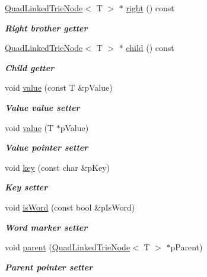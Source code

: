 \begin{DoxyCompactItemize}
\hyperlink{classQuadLinkedTrieNode}{Quad\-Linked\-Trie\-Node}$<$ T $>$ $\ast$ \hyperlink{classQuadLinkedTrieNode_a09d2cf3b6175313271c0f607a870f2c7}{right} () const 
\begin{DoxyCompactList}\small\item\em {\bfseries Right brother getter} \end{DoxyCompactList}\item 
\hyperlink{classQuadLinkedTrieNode}{Quad\-Linked\-Trie\-Node}$<$ T $>$ $\ast$ \hyperlink{classQuadLinkedTrieNode_a386e85a2b259728ec9fbe26907823dcf}{child} () const 
\begin{DoxyCompactList}\small\item\em {\bfseries Child getter} \end{DoxyCompactList}\item 
void \hyperlink{classQuadLinkedTrieNode_af5c5a72f9e54f9cac7c59dea467e4586}{value} (const T \&p\-Value)
\begin{DoxyCompactList}\small\item\em {\bfseries Value value setter} \end{DoxyCompactList}\item 
void \hyperlink{classQuadLinkedTrieNode_aa0f8a7aee7f4bd401d0eee79448843a0}{value} (T $\ast$p\-Value)
\begin{DoxyCompactList}\small\item\em {\bfseries Value pointer setter} \end{DoxyCompactList}\item 
void \hyperlink{classQuadLinkedTrieNode_a41d494eeb9a73539461a6ccacd8a0afd}{key} (const char \&p\-Key)
\begin{DoxyCompactList}\small\item\em {\bfseries Key setter} \end{DoxyCompactList}\item 
void \hyperlink{classQuadLinkedTrieNode_ae3ba3402838ed5e85fb888702fcc8670}{is\-Word} (const bool \&p\-Is\-Word)
\begin{DoxyCompactList}\small\item\em {\bfseries Word marker setter} \end{DoxyCompactList}\item 
void \hyperlink{classQuadLinkedTrieNode_ae21b708d187d90bf9c6f0c80b7848d0c}{parent} (\hyperlink{classQuadLinkedTrieNode}{Quad\-Linked\-Trie\-Node}$<$ T $>$ $\ast$p\-Parent)
\begin{DoxyCompactList}\small\item\em {\bfseries Parent pointer setter} \end{DoxyCompactList}\item 

\end{DoxyCompactItemize}

